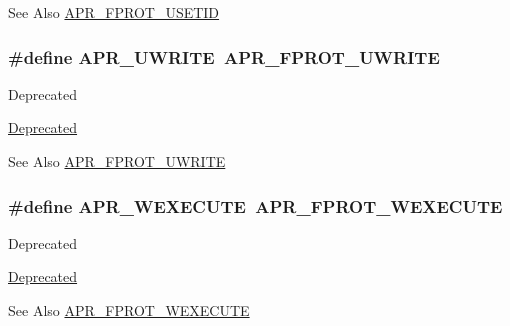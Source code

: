 \begin{DoxySeeAlso}{See Also}
\hyperlink{group__apr__file__permissions_ga67caebf5bbe4f3f4b6252a75e5ce066f}{A\-P\-R\-\_\-\-F\-P\-R\-O\-T\-\_\-\-U\-S\-E\-T\-I\-D} 
\end{DoxySeeAlso}
\hypertarget{group__apr__file__permissions_ga4faa7fdfa3bcda569dd1e23ae002c5e5}{
\subsubsection[{A\-P\-R\-\_\-\-U\-W\-R\-I\-T\-E}]{\setlength{\rightskip}{0pt plus 5cm}\#define A\-P\-R\-\_\-\-U\-W\-R\-I\-T\-E~{\bf A\-P\-R\-\_\-\-F\-P\-R\-O\-T\-\_\-\-U\-W\-R\-I\-T\-E}}}\label{group__apr__file__permissions_ga4faa7fdfa3bcda569dd1e23ae002c5e5}
\begin{DoxyRefDesc}{Deprecated}
\item[\hyperlink{deprecated__deprecated000005}{Deprecated}]\end{DoxyRefDesc}
\begin{DoxySeeAlso}{See Also}
\hyperlink{group__apr__file__permissions_ga50b985779b15fbfdae0758e98ffb92af}{A\-P\-R\-\_\-\-F\-P\-R\-O\-T\-\_\-\-U\-W\-R\-I\-T\-E} 
\end{DoxySeeAlso}
\hypertarget{group__apr__file__permissions_ga7bf4afea195c62f41aad1d3e94dcdac6}{
\subsubsection[{A\-P\-R\-\_\-\-W\-E\-X\-E\-C\-U\-T\-E}]{\setlength{\rightskip}{0pt plus 5cm}\#define A\-P\-R\-\_\-\-W\-E\-X\-E\-C\-U\-T\-E~{\bf A\-P\-R\-\_\-\-F\-P\-R\-O\-T\-\_\-\-W\-E\-X\-E\-C\-U\-T\-E}}}\label{group__apr__file__permissions_ga7bf4afea195c62f41aad1d3e94dcdac6}
\begin{DoxyRefDesc}{Deprecated}
\item[\hyperlink{deprecated__deprecated000014}{Deprecated}]\end{DoxyRefDesc}
\begin{DoxySeeAlso}{See Also}
\hyperlink{group__apr__file__permissions_ga760d69c09b38ddf1e0aff09362d8ce11}{A\-P\-R\-\_\-\-F\-P\-R\-O\-T\-\_\-\-W\-E\-X\-E\-C\-U\-T\-E} 
\end{DoxySeeAlso}
